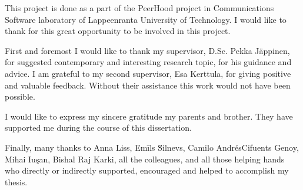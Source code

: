 %
%
This project is done as a part of the PeerHood project in Communications Software laboratory of Lappeenranta University of Technology.
%
I would like to thank for this great opportunity to be involved in this project.

%
First and foremost I would like to thank my supervisor, D.Sc. Pekka J\"appinen, for suggested contemporary and interesting research topic, for his guidance and advice. 
%
I am grateful to my second supervisor, Esa Kerttula, for giving positive and valuable feedback. 
%
Without their assistance this work would not have been possible.

%
I would like to express my sincere gratitude my parents and brother.
%
They have supported me during the course of this dissertation.

%
Finally, many thanks to Anna Liss, Em\={i}ls \u{S}i\cb l\cb nevs, Camilo Andr\'{e}sCifuents Genoy, Mihai Iu\c{s}an, Bishal Raj Karki, all the colleagues, and all those helping hands who directly or indirectly supported, encouraged and helped to accomplish my thesis.